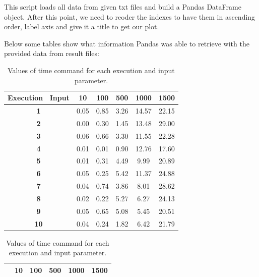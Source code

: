 \documentclass[11pt]{article}
\begin{document}
This script loads all data from given txt files and build a Pandas DataFrame object. After this point, we need to reoder the indexes to have them in ascending order, label axis and give it a title to get our plot.

Below some tables show what information Pandas was able to retrieve with the provided data from result files:

\begin{table}
\centering
\begin{tabular}{|c|c|c|c|c|c|}
\hline
\textbf{Execution \ Input} & \textbf{10} & \textbf{100} & \textbf{500} & \textbf{1000} & \textbf{1500} \\ \hline
\textbf{1}                 & 0.05        & 0.85         & 3.26         & 14.57         & 22.15         \\ \hline
\textbf{2}                 & 0.00        & 0.30         & 1.45         & 13.48         & 29.00         \\ \hline
\textbf{3}                 & 0.06        & 0.66         & 3.30         & 11.55         & 22.28         \\ \hline
\textbf{4}                 & 0.01        & 0.01         & 0.90         & 12.76         & 17.60         \\ \hline
\textbf{5}                 & 0.01        & 0.31         & 4.49         & 9.99          & 20.89         \\ \hline
\textbf{6}                 & 0.05        & 0.25         & 5.42         & 11.37         & 24.88         \\ \hline
\textbf{7}                 & 0.04        & 0.74         & 3.86         & 8.01          & 28.62         \\ \hline
\textbf{8}                 & 0.02        & 0.22         & 5.27         & 6.27          & 24.13         \\ \hline
\textbf{9}                 & 0.05        & 0.65         & 5.08         & 5.45          & 20.51         \\ \hline
\textbf{10}                & 0.04        & 0.24         & 1.82         & 6.42          & 21.79         \\ \hline
\end{tabular}
\caption{\label{exec}Values of time command for each execution and input parameter.}
\vspace{2cm}
\begin{tabular}{|c|c|c|c|c|c|}
\hline
               & \textbf{10} & \textbf{100} & \textbf{500} & \textbf{1000} & \textbf{1500} \\ \hline

\end{tabular}
\end{table}
\end{document}
